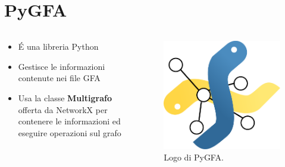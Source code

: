 \documentclass{beamer}
\begin{document}
\section{PyGFA}
\begin{frame}{\secname}

	\begin{columns}
		\begin{column}{0.7\textwidth}
			\begin{itemize}
				\item \'E una libreria Python
				\item Gestisce le informazioni contenute nei file GFA
				\item Usa la classe \textbf{Multigrafo} offerta da NetworkX per
					contenere le informazioni ed eseguire operazioni
					sul grafo
			\end{itemize}
		\end{column}
		
		\begin{column}{0.3\textwidth}
			\begin{figure}
				\includegraphics[scale=0.25]{pygfa}
				\caption{Logo di PyGFA.}
			\end{figure}
		\end{column}
		
	\end{columns}
\end{frame}
\end{document}
